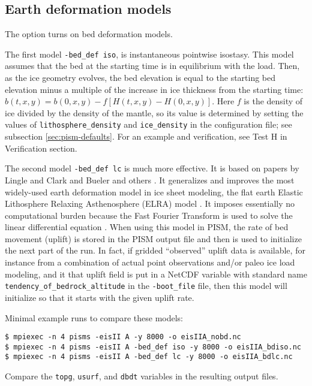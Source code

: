 \subsection{Earth deformation models} \label{subsect:beddef}  

The option  turns on bed deformation models.

The first model \verb|-bed_def iso|, is instantaneous pointwise isostasy.  This model assumes that the bed at the starting time is in equilibrium with the load.  Then, as the ice geometry evolves, the bed elevation is equal to the starting bed elevation minus a multiple of the increase in ice thickness from the starting time: $b(t,x,y) = b(0,x,y) - f [H(t,x,y) - H(0,x,y)]$.  Here $f$ is the density of ice divided by the density of the mantle, so its value is determined by setting the values of \verb|lithosphere_density| and \verb|ice_density| in the configuration file; see subsection \ref{sec:pism-defaults}.  For an example and verification, see Test H in Verification section. 

The second model \verb|-bed_def lc| is much more effective.  It is based on papers by Lingle and Clark \cite{LingleClark}  and Bueler and others \cite{BLKfastearth}.  It generalizes and improves the most widely-used earth deformation model in ice sheet modeling, the flat earth Elastic Lithosphere Relaxing Asthenosphere (ELRA) model \cite{Greve2001}.  It imposes  essentially no computational burden because the Fast Fourier Transform is used to solve the linear differential equation \cite{BLKfastearth}.  When using this model in PISM, the rate of bed movement (uplift) is stored in the PISM output file and then is used to initialize the next part of the run.  In fact, if gridded ``observed'' uplift data is available, for instance from a combination of actual point observations and/or paleo ice load modeling, and it that uplift field is put in a NetCDF variable with standard name \verb|tendency_of_bedrock_altitude| in the  \texttt{-boot_file} file, then this model will initialize so that it starts with the given uplift rate.

Minimal example runs to compare these models:
\begin{verbatim}
$ mpiexec -n 4 pisms -eisII A -y 8000 -o eisIIA_nobd.nc
$ mpiexec -n 4 pisms -eisII A -bed_def iso -y 8000 -o eisIIA_bdiso.nc
$ mpiexec -n 4 pisms -eisII A -bed_def lc -y 8000 -o eisIIA_bdlc.nc
\end{verbatim}
Compare the \texttt{topg}, \texttt{usurf}, and \texttt{dbdt} variables in the resulting output files.


